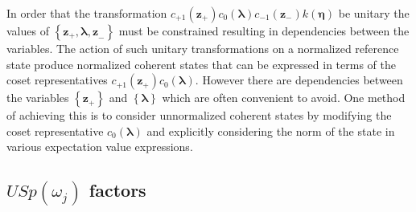 \documentclass[aps,preprint]{revtex4}%
\begin{document}
In order that the transformation $c_{+1}\left(  \mathbf{z}_{+}\right)
c_{0}\left(  \mathbf{\lambda}\right)  c_{-1}\left(  \mathbf{z}_{-}\right)
k\left(  \mathbf{\eta}\right)  $ be unitary the values of $\left\{
\mathbf{z}_{+},\mathbf{\lambda,z}_{-}\right\}  $ must be constrained resulting
in dependencies between the variables. The action of such unitary
transformations on a normalized reference state produce normalized coherent
states that can be expressed in terms of the coset representatives
$c_{+1}\left(  \mathbf{z}_{+}\right)  c_{0}\left(  \mathbf{\lambda}\right)  $.
However there are dependencies between the variables $\left\{  \mathbf{z}%
_{+}\right\}  $ and $\left\{  \mathbf{\lambda}\right\}  $ which are often
convenient to avoid. One method of achieving this is to consider unnormalized
coherent states by modifying the coset representative $c_{0}\left(
\mathbf{\lambda}\right)  $ and explicitly considering the norm of the state in
various expectation value expressions.

\subsection{$USp\left(  \omega_{j}\right)  $ factors}
\end{document}
